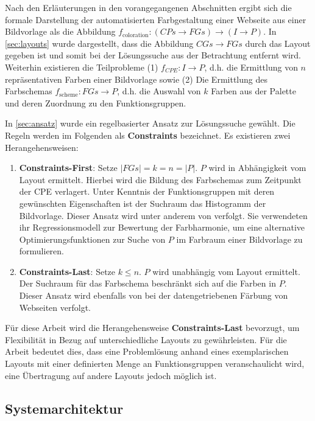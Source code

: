 Nach den Erläuterungen in den vorangegangenen Abschnitten ergibt sich die formale Darstellung der automatisierten Farbgestaltung einer Webseite aus einer Bildvorlage als die Abbildung $f_\text{coloration}: (CPs \to FGs) \to (I \to P)$. In \autoref{sec:layouts} wurde dargestellt, dass die Abbildung $CGs \to FGs$ durch das Layout gegeben ist und somit bei der Lösungssuche aus der Betrachtung entfernt wird. Weiterhin existieren die Teilprobleme (1) $f_{CPE}: I \to P$, d.h. die Ermittlung von $n$ repräsentativen Farben einer Bildvorlage sowie (2) Die Ermittlung des Farbschemas $f_\text{scheme}: FGs \to P$, d.h. die Auswahl von $k$ Farben aus der Palette und deren Zuordnung zu den Funktionsgruppen.

In \autoref{sec:ansatz} wurde ein regelbasierter Ansatz zur Lösungssuche gewählt. Die Regeln werden im Folgenden als \textbf{Constraints} bezeichnet. Es existieren zwei Herangehensweisen:
\begin{enumerate}
    \item \textbf{Constraints-First}: Setze $|FGs| = k = n = |P|$. $P$ wird in Abhängigkeit vom Layout ermittelt. Hierbei wird die Bildung des Farbschemas zum Zeitpunkt der CPE verlagert. Unter Kenntnis der Funktionsgruppen mit deren gewünschten Eigenschaften ist der Suchraum das Histogramm der Bildvorlage. Dieser Ansatz wird unter anderem von \citet{colorcomp} verfolgt. Sie verwendeten ihr Regressionsmodell zur Bewertung der Farbharmonie, um eine alternative Optimierungsfunktionen zur Suche von $P$ im Farbraum einer Bildvorlage zu formulieren.
    \item \textbf{Constraints-Last}: Setze $k \leq n$. $P$ wird unabhängig vom Layout ermittelt. Der Suchraum für das Farbschema beschränkt sich auf die Farben in $P$. Dieser Ansatz wird ebenfalls von \citep{webpage} bei der datengetriebenen Färbung von Webseiten verfolgt.
\end{enumerate}

Für diese Arbeit wird die Herangehensweise \textbf{Constraints-Last} bevorzugt, um Flexibilität in Bezug auf unterschiedliche Layouts zu gewährleisten. Für die Arbeit bedeutet dies, dass eine Problemlösung anhand eines exemplarischen Layouts mit einer definierten Menge an Funktionsgruppen veranschaulicht wird, eine Übertragung auf andere Layouts jedoch möglich ist.

\subsection{Systemarchitektur}
\label{sec:architektur}

